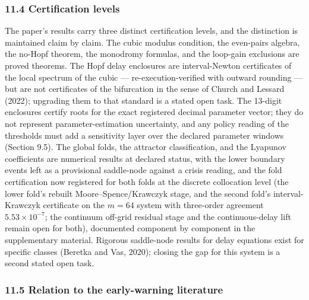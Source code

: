 \documentclass[11pt]{article}
\begin{document}
\subsubsection{11.4 Certification levels}\label{certification-levels}

The paper's results carry three distinct certification levels, and the
distinction is maintained claim by claim. The cubic modulus condition,
the even-pairs algebra, the no-Hopf theorem, the monodromy formulas, and
the loop-gain exclusions are proved theorems. The Hopf delay enclosures
are interval-Newton certificates of the local spectrum of the cubic ---
re-execution-verified with outward rounding --- but are not certificates
of the bifurcation in the sense of Church and Lessard (2022); upgrading
them to that standard is a stated open task. The 13-digit enclosures
certify roots for the exact registered decimal parameter vector; they do
not represent parameter-estimation uncertainty, and any policy reading
of the thresholds must add a sensitivity layer over the declared
parameter windows (Section 9.5). The global folds, the attractor
classification, and the Lyapunov coefficients are numerical results at
declared status, with the lower boundary events left as a provisional
saddle-node against a crisis reading, and the fold certification now
registered for both folds at the discrete collocation level (the lower
fold's rebuilt Moore--Spence/Krawczyk stage, and the second fold's
interval-Krawczyk certificate on the \(m = 64\) system with three-order
agreement \(5.53\times10^{-7}\); the continuum off-grid residual stage
and the continuous-delay lift remain open for both), documented
component by component in the supplementary material. Rigorous
saddle-node results for delay equations exist for specific classes
(Beretka and Vas, 2020); closing the gap for this system is a second
stated open task.

\subsubsection{11.5 Relation to the early-warning
literature}\label{relation-to-the-early-warning-literature}
\end{document}
